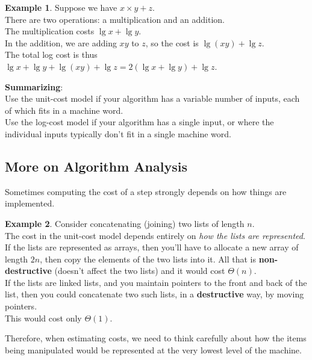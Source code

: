 \documentclass[12pt]{article}
\theoremstyle{plain}
\theoremstyle{definition}
\newtheorem*{ex*}{Example}
\newcommand{\lecture}[1]{\marginpar{{\footnotesize $\leftarrow$ \underline{#1}}}}
\begin{document}
\begin{ex*}
Suppose we have $x \times y + z$. \\
There are two operations: a multiplication and an addition. \\
The multiplication costs $\lg{x} + \lg{y}$. \\
In the addition, we are adding $xy$ to $z$, so the cost is $\lg(xy) + \lg{z}$. \\
The total log cost is thus $\lg{x} + \lg{y} + \lg(xy) + \lg{z} = 2(\lg{x} + \lg{y}) + \lg{z}$.
\end{ex*}

\textbf{Summarizing}: \\
Use the unit-cost model if your algorithm has a variable number of inputs, each of which fits in a machine word. \\

Use the log-cost model if your algorithm has a single input, or where the individual inputs typically don't fit in a single machine word.

\subsection{More on Algorithm Analysis}
\lecture{2016/09/13}
Sometimes computing the cost of a step strongly depends on how things are implemented.

\begin{ex*}
Consider concatenating (joining) two lists of length $n$. \\
The cost in the unit-cost model depends entirely on \emph{how the lists are represented}. \\

If the lists are represented as arrays, then you'll have to allocate a new array of length $2n$, then copy the elements of the two lists into it.
All that is \textbf{non-destructive} (doesn't affect the two lists) and it would cost $\Theta(n)$.\\

If the lists are linked lists, and you maintain pointers to the front and back of the list, then you could concatenate two such lists, in a \textbf{destructive} way, by moving pointers. \\
This would cost only $\Theta(1)$.
\end{ex*}

Therefore, when estimating costs, we need to think carefully about how the items being manipulated would be represented at the very lowest level of the machine.
\end{document}
